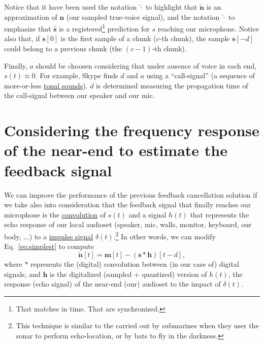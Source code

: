 Notice that it have been used the notation $\tilde{\cdot}$ to
highlight that $\tilde{\mathbf n}$ is an approximation of ${\mathbf
  n}$ (our sampled true-voice signal), and the notation $\hat{\cdot}$
to emphasize that $\hat{\mathbf s}$ is a registered\footnote{That
matches in time. That are synchronized.} prediction for $s$ reaching
our microphone. Notice also that, if ${\mathbf s}[0]$ is the first
sample of a chunk ($c$-th chunk), the sample ${\mathbf s}[-d]$ could
belong to a previous chunk (the $(c-1)$-th chunk).

Finally, $a$ should be choosen considering that under ausence of voice
in each end, $s(t)\approx 0$. For example, Skype finds $d$ and $a$
using a ``call-signal'' (a sequence of more-or-less
\href{https://en.wikipedia.org/wiki/Musical_tone}{tonal sounds}). $d$
is determined measuring the propagation time of the call-signal
between our speaker and our mic.

\section{Considering the frequency response of the near-end to estimate the feedback signal}
We can improve the performance of the previous feedback cancellation
solution if we take also into consideration that the feedback signal
that finally reaches our microphone is the
\href{https://en.wikipedia.org/wiki/Convolution}{convolution} of
$s(t)$ and a signal $h(t)$ that represents the echo response of our
local audioset (speaker, mic, walls, monitor, keyboard, our body, ...)
to a \href{https://en.wikipedia.org/wiki/Impulse_response}{impulse
  signal} $\delta(t)$.\footnote{This technique is similar to the
  carried out by submarines when they user the sonar to perform
  echo-location, or by bats to fly in the darkness.} In other words,
we can modify Eq.~\eqref{eq:simplest} to compute
\begin{equation}
 \tilde{\mathbf n}[t] = {\mathbf m}[t] - ({\mathbf s}\ast{\mathbf h})[t-d],
  \label{eq:using_convolution}
\end{equation}
where $\ast$ represents the (digital) convolution between (in our case
of) digital signals, and ${\mathbf h}$ is the digitalized (sampled +
quantized) version of $h(t)$, the response (echo signal) of the near-end
(our) audioset to the impact of $\delta(t)$.

